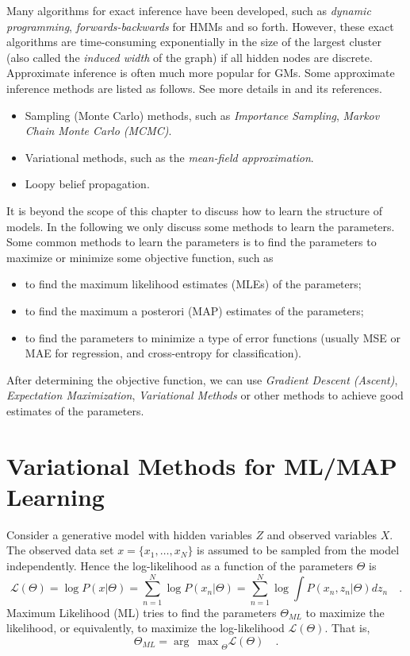\documentclass{article}
\begin{document}
Many algorithms for exact inference have been developed, such as \textit{dynamic programming},
\textit{forwards-backwards} for HMMs and so forth.
However, these exact algorithms are time-consuming exponentially in the size of the largest
cluster (also called the \textit{induced width} of the graph) if all hidden nodes are discrete.
Approximate inference is often much more popular for GMs.
Some approximate inference methods are listed as follows.
See more details in \cite{Murphy} and its references.
\begin{itemize}
  \item Sampling (Monte Carlo) methods, such as \textit{Importance Sampling},
  \textit{Markov Chain Monte Carlo (MCMC)}.
  \item Variational methods, such as the \textit{mean-field approximation}.
  \item Loopy belief propagation.
\end{itemize}

It is beyond the scope of this chapter to discuss how to learn the structure of models.
In the following we only discuss some methods to learn the parameters.
Some common methods to learn the parameters is to find the parameters to maximize or
minimize some objective function, such as
\begin{itemize}
\item to find the maximum likelihood estimates (MLEs) of the parameters;
\item to find the maximum a posterori (MAP) estimates of the parameters;
\item to find the parameters to minimize a type of error functions
(usually MSE or MAE for regression, and cross-entropy for classification).
\end{itemize}
After determining the objective function, we can use \textit{Gradient Descent (Ascent)},
\textit{Expectation Maximization}, \textit{Variational Methods} or
other methods to achieve good estimates of the parameters.


\section{Variational Methods for ML/MAP Learning}
Consider a generative model with hidden variables $Z$ and observed variables $X$.
The observed data set $x=\{x_1,\ldots, x_N\}$ is assumed to be sampled
from the model independently.
Hence the log-likelihood as a function of the parameters $\Theta$ is
\begin{equation}
\mathcal{L}(\Theta)=\log P(x|\Theta) = \sum^N_{n=1} \log P(x_n|\Theta)
= \sum^N_{n=1} \log\int P(x_n,z_n|\Theta) dz_n \quad .
\end{equation}
Maximum Likelihood (ML) tries to find the parameters $\Theta_{ML}$ to maximize
the likelihood, or equivalently, to maximize the log-likelihood $\mathcal{L}(\Theta)$.
That is,
\begin{equation}
\Theta_{ML} = {\arg\ \max}_{\Theta} \mathcal{L}(\Theta) \quad .
\end{equation}
\end{document}
